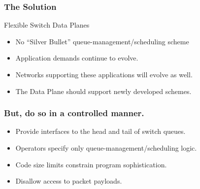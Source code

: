 \begin{frame}[plain]
\frametitle{The Solution}
Flexible Switch Data Planes
\begin{itemize}
\item No ``Silver Bullet'' queue-management/scheduling scheme
\item Application demands continue to evolve.
\item Networks supporting these applications will evolve as well.
\item The Data Plane should support newly developed schemes.
\end{itemize}
\end{frame}

\begin{frame}[plain]
\frametitle{But, do so in a controlled manner.}
\begin{itemize}
\item Provide interfaces to the head and tail of switch queues.
\item Operators specify only queue-management/scheduling logic.
\item Code size limits constrain program sophistication.
\item Disallow access to packet payloads.
\end{itemize}
\end{frame}

